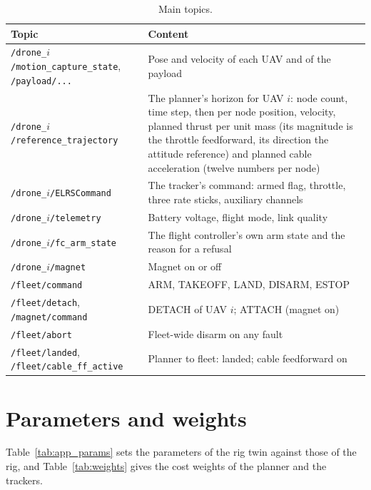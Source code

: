 \begin{table}[H]
\centering
\small
\caption{Main topics.}
\label{tab:app_topics}
\begin{tabularx}{\textwidth}{lX}
\toprule
Topic & Content \\
\midrule
\texttt{/drone\_}$i$\texttt{/motion\_capture\_state}, \texttt{/payload/...} & Pose and velocity of each UAV and of the payload \\
\texttt{/drone\_}$i$\texttt{/reference\_trajectory} & The planner's horizon for UAV $i$: node count, time step, then per node position, velocity, planned thrust per unit mass (its magnitude is the throttle feedforward, its direction the attitude reference) and planned cable acceleration (twelve numbers per node) \\
\texttt{/drone\_}$i$\texttt{/ELRSCommand} & The tracker's command: armed flag, throttle, three rate sticks, auxiliary channels \\
\texttt{/drone\_}$i$\texttt{/telemetry} & Battery voltage, flight mode, link quality \\
\texttt{/drone\_}$i$\texttt{/fc\_arm\_state} & The flight controller's own arm state and the reason for a refusal \\
\texttt{/drone\_}$i$\texttt{/magnet} & Magnet on or off \\
\texttt{/fleet/command} & ARM, TAKEOFF, LAND, DISARM, ESTOP \\
\texttt{/fleet/detach}, \texttt{/magnet/command} & DETACH of UAV $i$; ATTACH (magnet on) \\
\texttt{/fleet/abort} & Fleet-wide disarm on any fault \\
\texttt{/fleet/landed}, \texttt{/fleet/cable\_ff\_active} & Planner to fleet: landed; cable feedforward on \\
\bottomrule
\end{tabularx}
\end{table}

\section{Parameters and weights}
\label{sec:app_params}

Table~\ref{tab:app_params} sets the parameters of the rig twin against those of the rig, and
Table~\ref{tab:weights} gives the cost weights of the planner and the trackers.

